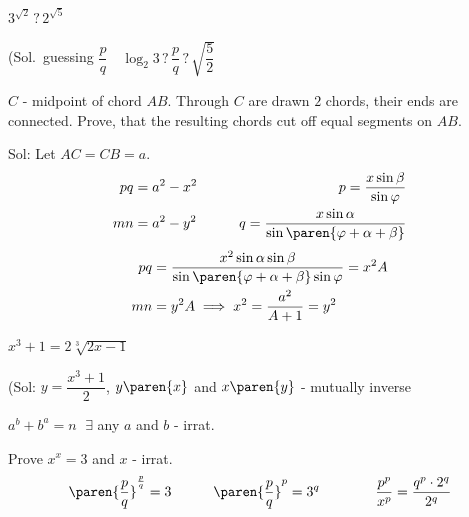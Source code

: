 \documentclass{article}
\newcommand{\strikethrough}[1]{}  %
\begin{document}
\problem  %
$3^{\sqrt{2}} \mathrel{?} 2^{\sqrt{5}}$

(Sol.\ guessing $\dfrac{p}{q} \quad \log_{2}{3} \mathrel{?} \dfrac{p}{q} \mathrel{?} \sqrt{\dfrac{5}{2}}$


\problem  %
$C$ - midpoint of chord $AB$.
Through $C$ are drawn $2$ chords, their ends are connected.
Prove, that the resulting chords cut off equal segments on $AB$.

Sol:
Let $AC = CB = a$.
\begin{alignat*}{2}
  p q &= a^2 - x^2  &\qquad  p = \frac{x \sin\beta}{\sin\varphi}  \\
  m n &= a^2 - y^2  &\qquad  q = \frac{x \sin\alpha}{\sin\paren{\varphi + \alpha + \beta}}
\end{alignat*}
\begin{align*}
  p q &= \frac{x^2 \sin\alpha \sin\beta}{\sin\paren{\varphi + \alpha + \beta} \sin\varphi}
       = x^2 A  \\
  m n &= y^2 A
  \implies
  x^2 = \frac{a^2}{A + 1}
      = y^2
\end{align*}


\problem  %
$x^3 + 1 = 2 \sqrt[3]{2 x - 1}$

(Sol: $y = \dfrac{x^3 + 1}{2}$, $y\paren{x}$ and $x\paren{y}$ - mutually inverse


\problem  %
$a^b + b^a = n$
$\; \exists$ any $a$ and $b$ - irrat.

Prove $x^x = 3$ and $x$ - irrat.
\begin{alignat*}{4}
  &\paren{\dfrac{p}{q}}^{\frac{p}{q}} = 3  \qquad
  &\paren{\dfrac{p}{q}}^{p} = 3^{q}  \qquad
  &\strikethrough{p^p = q^{p} \cdot 3^{q}}  \quad
  &\frac{p^p}{x^p} = \frac{q^{p} \cdot 2^{q}}{2^{q}}
\end{alignat*}
\end{document}
